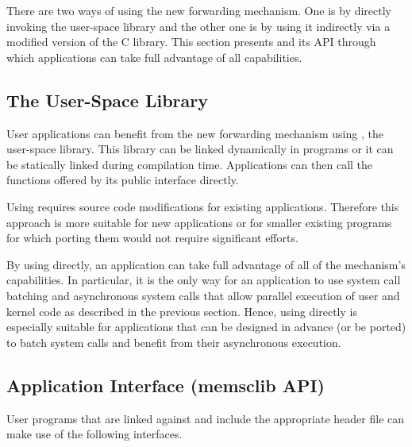 There are two ways of using the new \memsc forwarding mechanism. One is by
directly invoking the \memsc user-space library and the other one is by using
it indirectly via a modified version of the C library. This section presents
\lib and its API through which applications can take full advantage of all
\memsc capabilities.

\subsection{The \memsc User-Space Library}

User applications can benefit from the new forwarding mechanism using
\emph{\lib}, the \memsc user-space library. This library can be linked
dynamically in programs or it can be statically linked during compilation time.
Applications can then call the functions offered by its public interface
directly.

Using \lib requires source code modifications for existing applications.
Therefore this approach is more suitable for new applications or for smaller
existing programs for which porting them would not require significant efforts.

By using \lib directly, an application can take full advantage of all of the
\memsc mechanism's capabilities. In particular, it is the only way for an
application to use system call batching and asynchronous system calls that
allow parallel execution of user and kernel code as described in the previous
section. Hence, using \lib directly is especially suitable for applications
that can be designed in advance (or be ported) to batch system calls and
benefit from their asynchronous execution.

\subsection{Application Interface (memsclib API)}

User programs that are linked against \lib and include the appropriate header
file can make use of the following interfaces.

\break


